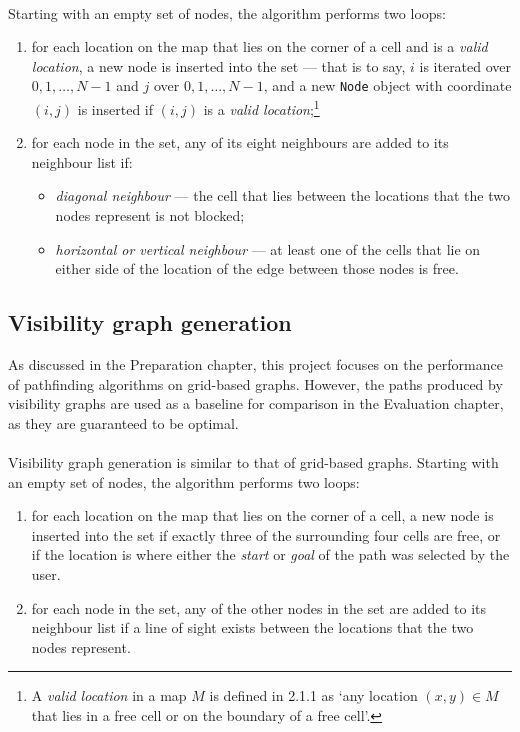 \documentclass[12pt,notitlepage]{report}
\begin{document}
\\
\noindent
Starting with an empty set of nodes, the algorithm performs two loops:
\begin{enumerate}
\item for each location on the map that lies on the corner of a cell and is a {\em valid location}, a new node is inserted into the set  --- that is to say, $i$ is iterated over $0,1,\ldots,N-1$ and $j$ over $0,1,\ldots,N-1$, and a new {\tt Node} object with coordinate $(i,j)$ is inserted if $(i,j)$ is a {\em valid location};\footnote{A {\em valid location} in a map $M$ is defined in 2.1.1 as `any location $(x,y) \in M$ that lies in a free cell or on the boundary of a free cell'.}
\item for each node in the set, any of its eight neighbours are added to its neighbour list if:
  \begin{itemize}
  \item {\em diagonal neighbour} --- the cell that lies between the locations that the two nodes represent is not blocked;
  \item {\em horizontal or vertical neighbour} --- at least one of the cells that lie on either side of the location of the edge between those nodes is free.
  \end{itemize}
\end{enumerate}

\subsection{Visibility graph generation}
As discussed in the Preparation chapter, this project focuses on the performance of pathfinding algorithms on grid-based graphs. However, the paths produced by visibility graphs are used as a baseline for comparison in the Evaluation chapter, as they are guaranteed to be optimal.\\

\\
\noindent
Visibility graph generation is similar to that of grid-based graphs. Starting with an empty set of nodes, the algorithm performs two loops:
\begin{enumerate}
\item for each location on the map that lies on the corner of a cell, a new node is inserted into the set if exactly three of the surrounding four cells are free, or if the location is where either the {\em start} or {\em goal} of the path was selected by the user.
\item for each node in the set, any of the other nodes in the set are added to its neighbour list if a line of sight exists between the locations that the two nodes represent.
\end{enumerate}
\end{document}
